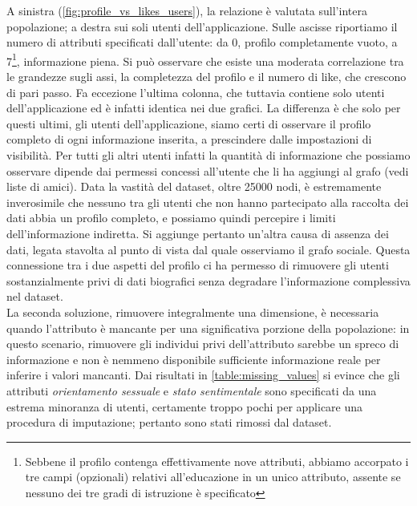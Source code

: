 A sinistra (\autoref{fig:profile_vs_likes_users}), la relazione è valutata sull'intera popolazione; a destra sui soli utenti dell'applicazione. Sulle ascisse riportiamo il numero di attributi specificati dall'utente: da 0, profilo completamente vuoto, a 7\footnote{Sebbene il profilo contenga effettivamente nove attributi, abbiamo accorpato i tre campi (opzionali) relativi all'educazione in un unico attributo, assente se nessuno dei tre gradi di istruzione è specificato}, informazione piena. Si può osservare che esiste una moderata correlazione tra le grandezze sugli assi, la completezza del profilo e il numero di like, che crescono di pari passo. Fa eccezione l'ultima colonna, che tuttavia contiene solo utenti dell'applicazione ed è infatti identica nei due grafici. La differenza è che solo per questi ultimi, gli utenti dell'applicazione, siamo certi di osservare il profilo completo di ogni informazione inserita, a prescindere dalle impostazioni di visibilità. Per tutti gli altri utenti infatti la quantità di informazione che possiamo osservare dipende dai permessi concessi all'utente che li ha aggiungi al grafo (vedi liste di amici).
Data la vastità del dataset, oltre 25000 nodi, è estremamente inverosimile che nessuno tra gli utenti che non hanno partecipato alla raccolta dei dati abbia un profilo completo, e possiamo quindi percepire i limiti dell'informazione indiretta. Si aggiunge pertanto un'altra causa di assenza dei dati, legata stavolta al punto di vista dal quale osserviamo il grafo sociale. Questa connessione tra i due aspetti del profilo ci ha permesso di rimuovere gli utenti sostanzialmente privi di dati biografici senza degradare l'informazione complessiva nel dataset.\\
La seconda soluzione, rimuovere integralmente una dimensione, è necessaria quando l'attributo è mancante per una significativa porzione della popolazione: in questo scenario, rimuovere gli individui privi dell'attributo sarebbe un spreco di informazione e non è nemmeno disponibile sufficiente informazione reale per inferire i valori mancanti. Dai risultati in \autoref{table:missing_values} si evince che gli attributi \textit{orientamento sessuale} e \textit{stato sentimentale} sono specificati da una estrema minoranza di utenti, certamente troppo pochi per applicare una procedura di imputazione; pertanto sono stati rimossi dal dataset.
